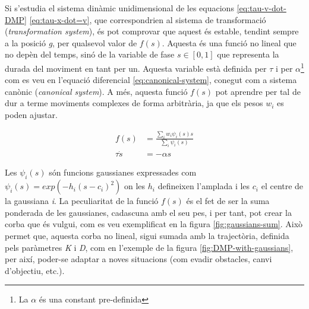 \documentclass[12pt,a4paper,final,twoside]{article}
\begin{document}
Si s'estudia el sistema dinàmic unidimensional de les equacions \eqref{eq:tau-v-dot-DMP} \eqref{eq:tau-x-dot=v}, que correspondrien al sistema de transformació (\textit{transformation system}), és pot comprovar que aquest és estable, tendint sempre a la posició \textit{g}, per qualsevol valor de $f(s)$. Aquesta és una funció no lineal que no depèn del temps, sinó de la variable de fase $s\in [0,1]$ que representa la durada del moviment en tant per un. Aquesta variable està definida per $\tau$ i per $\alpha$\footnote{La $\alpha$ és una constant pre-definida} com es veu en l'equació diferencial \eqref{eq:canonical-system}, conegut com a sistema canònic (\textit{canonical system}). A més, aquesta funció $f(s)$ pot aprendre per tal de dur a terme moviments complexes de forma arbitrària, ja que els pesos $w_i$ es poden ajustar.

\begin{align}
f(s) &= \frac{\sum_i w_i \psi_i(s)s}{\sum_i \psi_i(s)} \\
\tau \dot{s} &= - \alpha s \label{eq:canonical-system}
\end{align}

Les $\psi_i(s)$ són funcions gaussianes expressades com $\psi_i(s)=exp(-h_i(s-c_i)^2)$ on les $h_i$ defineixen l'amplada i les $c_i$ el centre de la gaussiana \textit{i}. La peculiaritat de la funció $f(s)$ és el fet de ser la suma ponderada de les gaussianes, cadascuna amb el seu pes, i per tant, pot crear la corba que és vulgui, com es veu exemplificat en la figura \ref{fig:gaussians-sum}. Això permet que, aquesta corba no lineal, sigui sumada amb la trajectòria, definida pels paràmetres \textit{K} i \textit{D}, com en l'exemple de la figura \ref{fig:DMP-with-gaussians}, per així, poder-se adaptar a noves situacions (com evadir obstacles, canvi d'objectiu, etc.).
\end{document}
